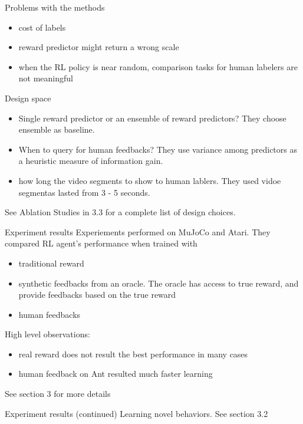 \documentclass{beamer}
\begin{document}
\begin{frame}{Problems with the methods}
\begin{itemize}
  \item cost of labels
  \item reward predictor might return a wrong scale
  \item when the RL policy is near random, comparison tasks
    for human labelers are not meaningful
\end{itemize}
\end{frame}

\begin{frame}{Design space}
\begin{itemize}
  \item Single reward predictor or an ensemble of reward predictors?
    They choose ensemble as baseline.
  \item When to query for human feedbacks?
    They use variance among predictors as a heuristic measure of 
    information gain. 
  \item how long the video segments to show to human lablers. 
    They used vidoe segmentas lasted from 3 - 5 seconds.
\end{itemize}
See Ablation Studies in 3.3 for a complete list of design choices. 
\end{frame}

\begin{frame}{Experiment results}
Experiements performed on MuJoCo and Atari. They compared RL agent's 
performance when trained with 
  \begin{itemize}
    \item traditional reward
    \item synthetic feedbacks from an oracle. The oracle has access to 
      true reward, and provide feedbacks based on the true reward
    \item human feedbacks
  \end{itemize}

High level observations:
\begin{itemize}
  \item real reward does not result the best performance in many cases
  \item human feedback on Ant resulted much faster learning
\end{itemize}

See section 3 for more details
\end{frame}

\begin{frame}{Experiment results (continued)}
Learning novel behaviors. See section 3.2
\end{frame}
\end{document}
